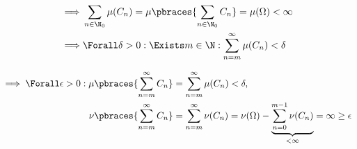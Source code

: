 \begin{solution}
\begin{align*}
    \implies &
    \sum_{n \in \N_0}
        \mu(C_n)
    =
    \mu \pbraces{\sum_{n \in \N_0} C_n}
    =
    \mu(\Omega)
    <
    \infty \\
    \implies &
    \Forall \delta > 0:
        \Exists m \in \N:
            \sum_{n=m}^\infty
                \mu(C_n)
            <
            \delta
\end{align*}

\begin{align*}
    \implies
    \Forall \epsilon > 0:
        \mu \pbraces{\sum_{n=m}^\infty C_n} & = \sum_{n=m}^\infty \mu(C_n) < \delta, \\
        \nu \pbraces{\sum_{n=m}^\infty C_n} & = \sum_{n=m}^\infty \nu(C_n) = \nu(\Omega) - \underbrace{\sum_{n=0}^{m-1} \nu(C_n)}_{< \infty} = \infty \geq \epsilon
\end{align*}

\end{solution}

    